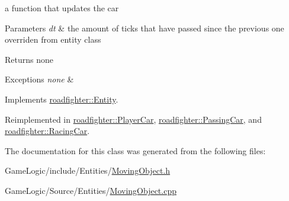 a function that updates the car 
\begin{DoxyParams}{Parameters}
{\em dt} & the amount of ticks that have passed since the previous one overriden from entity class \\
\hline
\end{DoxyParams}
\begin{DoxyReturn}{Returns}
none 
\end{DoxyReturn}

\begin{DoxyExceptions}{Exceptions}
{\em none} & \\
\hline
\end{DoxyExceptions}


Implements \hyperlink{classroadfighter_1_1Entity_a66614a11004d6f9516473f60b530f689}{roadfighter\+::\+Entity}.



Reimplemented in \hyperlink{classroadfighter_1_1PlayerCar_aa1dcbec01dde1b212e4919b61338edde}{roadfighter\+::\+Player\+Car}, \hyperlink{classroadfighter_1_1PassingCar_ade5ebca5d7dbdb75bd9eee5817972363}{roadfighter\+::\+Passing\+Car}, and \hyperlink{classroadfighter_1_1RacingCar_a2e8f3c63381a1fe432cddcc1f34fb935}{roadfighter\+::\+Racing\+Car}.



The documentation for this class was generated from the following files\+:\begin{DoxyCompactItemize}
\item 
Game\+Logic/include/\+Entities/\hyperlink{MovingObject_8h}{Moving\+Object.\+h}\item 
Game\+Logic/\+Source/\+Entities/\hyperlink{MovingObject_8cpp}{Moving\+Object.\+cpp}\end{DoxyCompactItemize}
